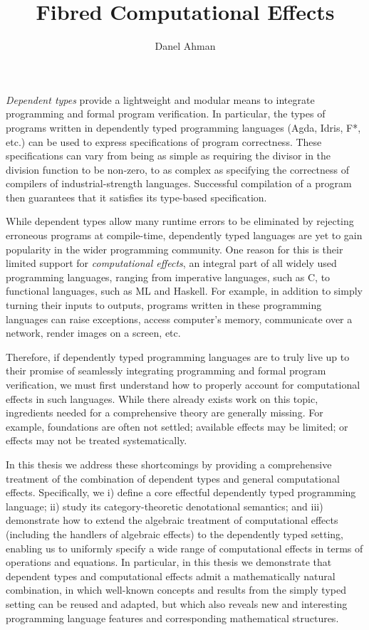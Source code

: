 \documentclass[phd,lfcs,twoside,logo]{infthesis}
\title{
Fibred Computational Effects
}
\author{Danel Ahman}
\theoremstyle{definition}
\begin{document}
\begin{preliminary}

\maketitle

\begin{laysummary}
%
\emph{Dependent types} provide a lightweight and modular means to integrate programming and formal program verification. In particular, the types of programs written in dependently typed programming languages (Agda, Idris, F*, etc.) can be used to express specifications of program correctness. These specifications can vary from being as simple as requiring the divisor in the division function to be non-zero, to as complex as specifying the correctness of compilers of industrial-strength languages. Successful compilation of a program then guarantees that it satisfies its type-based specification.

While dependent types allow many runtime errors to be eliminated by rejecting erroneous programs at compile-time, dependently typed languages are yet to gain popularity in the wider programming community. One reason for this is their limited support for \emph{computational effects}, an integral part of all widely used programming languages, ranging from imperative languages, such as C, to functional languages, such as ML and Haskell.
For example, in addition to simply turning their inputs to outputs, programs written in these programming languages can raise exceptions, access computer's memory, communicate over a network, render images on a screen, etc.

Therefore, if 
dependently typed programming languages are to truly live up to their promise of seamlessly integrating  programming and formal program verification, we must first understand how to properly account for computational effects in such languages.
While there already exists work on this topic, ingredients needed for a comprehensive theory are generally missing. For example, foundations are often not settled; available effects may be limited; or effects may not be treated systematically.

In this thesis we address these shortcomings by providing a comprehensive treatment of the combination of dependent types and general computational effects. Specifically, we i) define a core effectful dependently typed programming language; ii) study its category-theoretic denotational semantics;
and iii) demonstrate how to extend the algebraic treatment of computational effects (including the handlers of algebraic effects) to the dependently typed setting, enabling us to uniformly specify a wide range of computational effects in terms of operations and equations. 
In particular, in this thesis we demonstrate that  dependent types and computational effects admit a mathematically natural combination, in which well-known concepts and results from the simply typed setting can be reused and adapted, but which also reveals new and interesting programming language features and corresponding mathematical structures. 


\end{laysummary}
\end{preliminary}
\end{document}
